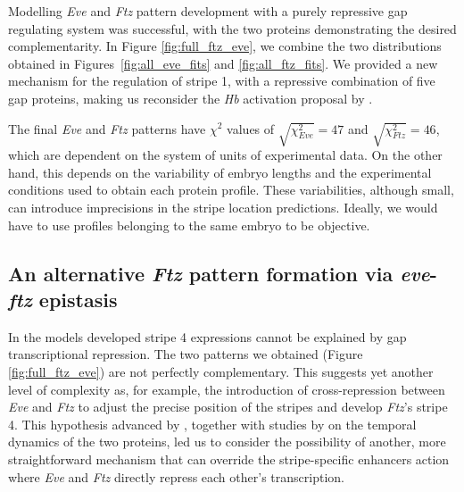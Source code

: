 \documentclass[final,authoryear, 5p, times]{elsarticle}
\begin{document}
Modelling \textit{Eve} and \textit{Ftz} pattern development with a purely repressive gap regulating system was successful, with the two proteins demonstrating the desired complementarity. In Figure \ref{fig:full_ftz_eve}, we combine the two distributions obtained in Figures~\ref{fig:all_eve_fits} and \ref{fig:all_ftz_fits}. We provided a new mechanism for the regulation of stripe 1, with a repressive combination of five gap proteins, making us reconsider the \textit{Hb} activation proposal by \cite{Fuji}. 



The final \textit{Eve} and \textit{Ftz} patterns have $\chi^2$ values of $\sqrt{\chi^2_{Eve}}=47$ and  $\sqrt{\chi^2_{Ftz}}=46$, which are dependent on the system of units of experimental data. On the other hand,  this depends on the variability of embryo lengths and the experimental conditions used to obtain each protein profile. These variabilities, although small, can introduce imprecisions in the stripe location predictions. Ideally, we would have to use profiles belonging to the same embryo to be objective. 




\subsection{\textbf{An alternative \textit{Ftz} pattern formation via \textit{eve}-\textit{ftz} epistasis}}

In the models developed stripe 4 expressions cannot be explained by gap transcriptional repression. The two patterns we obtained (Figure \ref{fig:full_ftz_eve}) are not perfectly complementary. This suggests yet another level of complexity as, for example, the introduction of cross-repression between \textit{Eve} and \textit{Ftz} to adjust the precise position of the stripes and develop \textit{Ftz}'s stripe 4.  This hypothesis advanced by \cite{Frash_correct}, together with studies by  \cite{Lim2018} on the temporal dynamics of the two proteins, led us to consider the possibility of another, more straightforward mechanism that can override the stripe-specific enhancers action where \textit{Eve} and \textit{Ftz} directly repress each other's transcription. 
\end{document}
